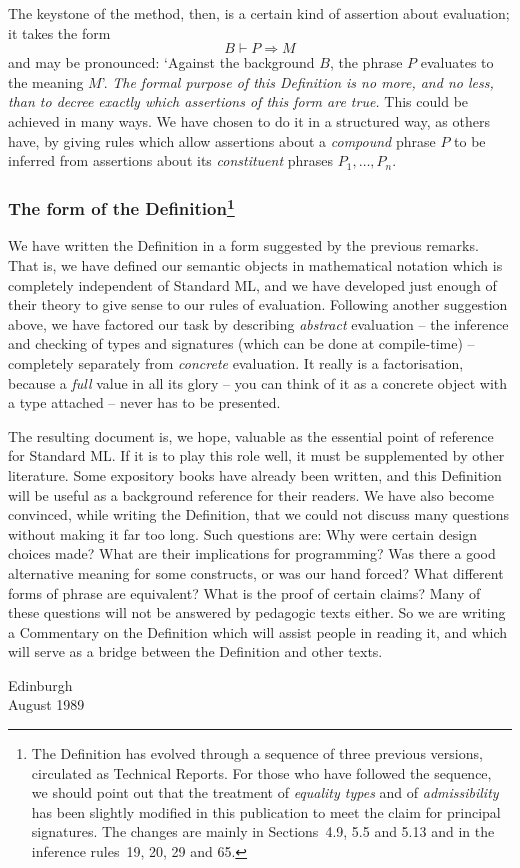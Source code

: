 The keystone of the method, then, is a certain kind of assertion about
evaluation; it takes the form
\[ B\vdash P\Rightarrow M\]
and may be pronounced: `Against the background $B$, the phrase $P$ evaluates
to the meaning $M$'.  {\sl The formal purpose of this Definition is no more, 
and no less, than to decree exactly which assertions of this form are true.}
This could be achieved in many ways. We have chosen to do it in a structured
way, as others have, by giving rules which allow assertions about a 
{\sl compound} phrase $P$ to be inferred from assertions about its
{\sl constituent} phrases $P_1,\ldots,P_n$.

\subsubsection*{The form of the Definition\footnote{
   The Definition has evolved through a sequence of three previous versions,
   circulated as Technical Reports.  For those who have followed the
   sequence, we should point out that the treatment of {\sl equality types}
   and of {\sl admissibility} has been slightly modified in this publication 
   to meet the claim for principal signatures.  The changes are mainly
   in Sections~4.9, 5.5 and 5.13 and in the inference rules~19, 20,
   29 and 65.}}
We have written the Definition in a form suggested by the previous remarks.
That is, we have defined our semantic objects in mathematical
notation which is completely independent of Standard ML, and we have
developed just enough of their theory to give sense to our rules of
evaluation. 
   Following another suggestion above, we have factored our task
by describing {\sl abstract} evaluation -- the inference and checking of
types and signatures (which can be done at compile-time) -- completely 
separately from {\sl concrete} evaluation.  
It really is a factorisation, because a {\sl full} value in all its glory --
you can think of it as a concrete object with a type
attached -- never has to be presented.

   The resulting document is, we hope, valuable as the essential point of 
reference for Standard ML.  If it is to play this role well, it must
be supplemented by other literature.  Some expository books have already been 
written, and this Definition will be useful as a 
background reference for their readers. We have also become convinced, while
writing the Definition, that we could not discuss many questions without 
making it far too long.  Such questions are: Why were certain design choices
made?  What are their implications for programming?  
Was there a good alternative meaning for some constructs, or was our
hand forced?  What different forms of phrase are equivalent? What is the proof
of certain claims?  Many of these
questions will not be answered by pedagogic texts either. So we are writing
a Commentary on the Definition which will assist people in reading it, and
which will serve as a bridge between the Definition and other texts.
\begin{flushright} Edinburgh\\August 1989 \end{flushright}

